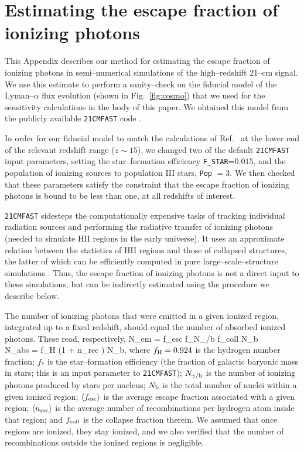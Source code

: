 \section{Estimating the escape fraction of ionizing photons}

This Appendix describes our method for estimating the escape fraction of ionizing photons in semi--numerical simulations of the high--redshift 21--cm signal. We use this estimate to perform a sanity--check on the fiducial model of the Lyman--$\alpha$ flux evolution (shown in Fig.~\ref{fig:cosmo}) that we used for the sensitivity calculations in the body of this paper. We obtained this model from the publicly available \texttt{21CMFAST} code \cite{2011MNRAS.411..955M}.  

In order for our fiducial model to match the calculations of Ref.~\cite{2012ApJ...746..125H} at the lower end of the relevant redshift range ($z\sim 15$), we changed two of the default \texttt{21CMFAST} input parameters, setting the star--formation efficiency  \verb|F_STAR|=$0.015$, and the population of ionizing sources to population III stars, \texttt{Pop} $=3$. We then checked that these parameters satisfy the constraint that the escape fraction of ionizing photons is bound to be less than one, at all redshifts of interest. 

\texttt{21CMFAST} sidesteps the computationally expensive tasks of tracking individual radiation sources and performing the radiative transfer of ionizing photons (needed to simulate HII regions in the early universe). It uses an approximate relation between the statistics of HII regions and those of collapsed structures, the latter of which can be efficiently computed in pure large--scale--structure simulations \cite{2004ApJ...613....1F}. Thus, the escape fraction of ionizing photons is not a direct input to these simulations, but can be indirectly estimated using the procedure we describe below. 

The number of ionizing photons that were emitted in a given ionized region, integrated up to a fixed redshift, should equal the number of absorbed ionized photons. These read, respectively, 
\beq    
\bga
N_{\rm em} = \langle f_{\rm esc} \rangle f_\ast N_{\gamma/{\rm b}} f_{\rm coll} N_{\rm b}\\
N_{\rm abs} = f_{\rm H} (1 + \langle n_{\rm rec} \rangle) N_{\rm b},
\ega
\label{eq:pbalance}
\eeq 
where $f_{\rm H} = 0.924$ is the hydrogen number fraction; $f_\ast$ is the star--formation efficiency (the fraction of galactic baryonic mass in stars; this is an input parameter to \texttt{21CMFAST}); $N_{\gamma/{\rm b}}$ is the number of ionizing photons produced by stars per nucleus; $N_{\rm b}$ is the total number of nuclei within a given ionized region; $\langle f_{\rm esc} \rangle$ is the average escape fraction associated with a given region; $\langle n_{\rm rec} \rangle$ is the average number of recombinations per hydrogen atom inside that region; and $f_{\rm coll}$ is the collapse fraction therein. We assumed that once regions are ionized, they stay ionized, and we also verified that the number of recombinations outside the ionized regions is negligible. 

